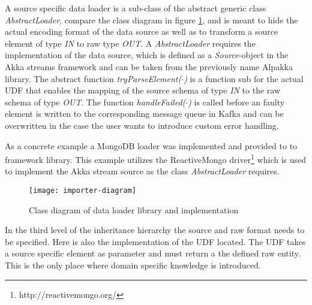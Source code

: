 A source specific data loader is a sub-class of the abstract generic class \textit{AbstractLoader}, compare the class diagram in figure \ref{fig:importer-diagram}, and is meant to hide the actual encoding format of the data source as well as to transform a source element of type \textit{IN} to raw type \textit{OUT}. A \textit{AbstractLoader} requires the implementation of the data source, which is defined as a \textit{Source}-object in the Akka streams framework and can be taken from the previously name Alpakka library. The abstract function \textit{tryParseElement($\cdot$)} is a function sub for the actual UDF that enables the mapping of the source schema of type \textit{IN} to the raw schema of type \textit{OUT}. The function \textit{handleFailed($\cdot$)} is called before an faulty element is written to the corresponding message queue in Kafka and can be overwritten in the case the user wants to introduce custom error handling.

As a concrete example a MongoDB loader was implemented and provided to to framework library. This example utilizes the ReactiveMongo driver\footnote{http://reactivemongo.org/} which is used to implement the Akka stream source as the class \textit{AbstractLoader} requires.

\begin{figure}[htb]
  \centering
  \texttt{[image: importer-diagram]}\\
  \caption{Class diagram of data loader library and implementation}
  \label{fig:importer-diagram}
\end{figure}

In the third level of the inheritance hierarchy the source and raw format needs to be specified. Here is also the implementation of the UDF located. The UDF takes a source specific element as parameter and must return a the defined raw entity. This is the only place where domain specific knowledge is introduced.

